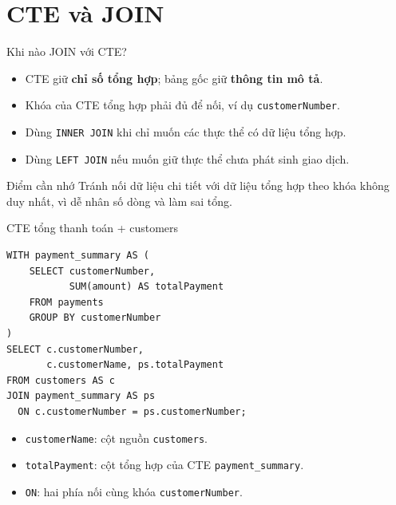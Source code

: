 \documentclass[aspectratio=169,10pt]{beamer}
\newcommand{\code}[1]{\texttt{#1}}
\begin{document}
\section{CTE và JOIN}

\begin{frame}[fragile]{Khi nào JOIN với CTE?}
\small
\begin{itemize}
\item CTE giữ \textbf{chỉ số tổng hợp}; bảng gốc giữ \textbf{thông tin mô tả}.
\item Khóa của CTE tổng hợp phải đủ để nối, ví dụ \code{customerNumber}.
\item Dùng \code{INNER JOIN} khi chỉ muốn các thực thể có dữ liệu tổng hợp.
\item Dùng \code{LEFT JOIN} nếu muốn giữ thực thể chưa phát sinh giao dịch.
\end{itemize}
\vspace{.3em}\begin{block}{Điểm cần nhớ}
Tránh nối dữ liệu chi tiết với dữ liệu tổng hợp theo khóa không duy nhất, vì dễ nhân số dòng và làm sai tổng.
\end{block}
\end{frame}

\begin{frame}[fragile]{CTE tổng thanh toán + customers}
\small
\begin{lstlisting}[basicstyle=\ttfamily\scriptsize]
WITH payment_summary AS (
    SELECT customerNumber,
           SUM(amount) AS totalPayment
    FROM payments
    GROUP BY customerNumber
)
SELECT c.customerNumber,
       c.customerName, ps.totalPayment
FROM customers AS c
JOIN payment_summary AS ps
  ON c.customerNumber = ps.customerNumber;
\end{lstlisting}
\vspace{.1em}
\begin{itemize}
\item \code{customerName}: cột nguồn \code{customers}.
\item \code{totalPayment}: cột tổng hợp của CTE \code{payment\_summary}.
\item \code{ON}: hai phía nối cùng khóa \code{customerNumber}.
\end{itemize}
\end{frame}
\end{document}
